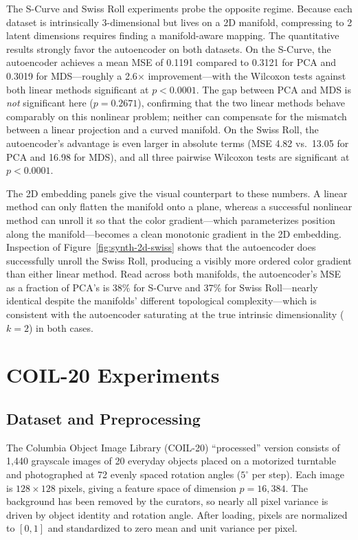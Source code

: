 \documentclass[11pt]{article}
\begin{document}
The S-Curve and Swiss Roll experiments probe the opposite regime. Because each dataset is intrinsically 3-dimensional but lives on a 2D manifold, compressing to 2 latent dimensions requires finding a manifold-aware mapping. The quantitative results strongly favor the autoencoder on both datasets. On the S-Curve, the autoencoder achieves a mean MSE of 0.1191 compared to 0.3121 for PCA and 0.3019 for MDS---roughly a 2.6$\times$ improvement---with the Wilcoxon tests against both linear methods significant at $p < 0.0001$. The gap between PCA and MDS is \emph{not} significant here ($p = 0.2671$), confirming that the two linear methods behave comparably on this nonlinear problem; neither can compensate for the mismatch between a linear projection and a curved manifold. On the Swiss Roll, the autoencoder's advantage is even larger in absolute terms (MSE 4.82 vs.\ 13.05 for PCA and 16.98 for MDS), and all three pairwise Wilcoxon tests are significant at $p < 0.0001$.

The 2D embedding panels give the visual counterpart to these numbers. A linear method can only flatten the manifold onto a plane, whereas a successful nonlinear method can unroll it so that the color gradient---which parameterizes position along the manifold---becomes a clean monotonic gradient in the 2D embedding. Inspection of Figure~\ref{fig:synth-2d-swiss} shows that the autoencoder does successfully unroll the Swiss Roll, producing a visibly more ordered color gradient than either linear method. Read across both manifolds, the autoencoder's MSE as a fraction of PCA's is 38\% for S-Curve and 37\% for Swiss Roll---nearly identical despite the manifolds' different topological complexity---which is consistent with the autoencoder saturating at the true intrinsic dimensionality ($k=2$) in both cases.

\section{COIL-20 Experiments}
\label{sec:coil20}

\subsection{Dataset and Preprocessing}

The Columbia Object Image Library (COIL-20) ``processed'' version consists of 1{,}440 grayscale images of 20 everyday objects placed on a motorized turntable and photographed at 72 evenly spaced rotation angles ($5^\circ$ per step). Each image is $128 \times 128$ pixels, giving a feature space of dimension $p = 16{,}384$. The background has been removed by the curators, so nearly all pixel variance is driven by object identity and rotation angle. After loading, pixels are normalized to $[0, 1]$ and standardized to zero mean and unit variance per pixel.
\end{document}

